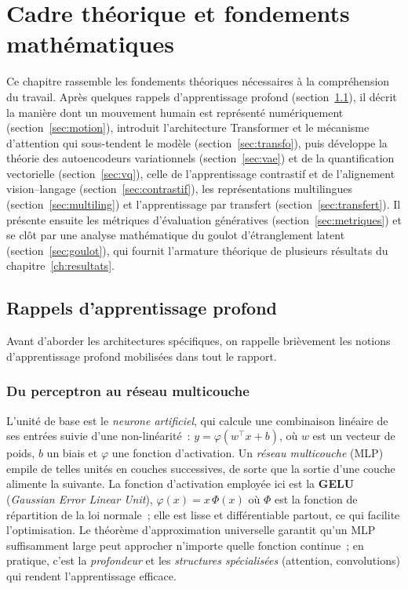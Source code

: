\documentclass[12pt,a4paper,oneside]{report}
\theoremstyle{definition}
\theoremstyle{plain}
\begin{document}
\chapter{Cadre théorique et fondements mathématiques}
\label{ch:theorie}

Ce chapitre rassemble les fondements théoriques nécessaires à la compréhension
du travail. Après quelques rappels d'apprentissage profond (section~\ref{sec:dl}),
il décrit la manière dont un mouvement humain est représenté numériquement
(section~\ref{sec:motion}), introduit l'architecture Transformer et le mécanisme
d'attention qui sous-tendent le modèle (section~\ref{sec:transfo}), puis développe
la théorie des autoencodeurs variationnels (section~\ref{sec:vae}) et de la
quantification vectorielle (section~\ref{sec:vq}), celle de l'apprentissage
contrastif et de l'alignement vision--langage (section~\ref{sec:contrastif}), les
représentations multilingues (section~\ref{sec:multiling}) et l'apprentissage par
transfert (section~\ref{sec:transfert}). Il présente ensuite les métriques
d'évaluation génératives (section~\ref{sec:metriques}) et se clôt par une analyse
mathématique du goulot d'étranglement latent (section~\ref{sec:goulot}), qui
fournit l'armature théorique de plusieurs résultats du chapitre~\ref{ch:resultats}.

\section{Rappels d'apprentissage profond}
\label{sec:dl}

Avant d'aborder les architectures spécifiques, on rappelle brièvement les notions
d'apprentissage profond mobilisées dans tout le rapport.

\subsection{Du perceptron au réseau multicouche}

L'unité de base est le \emph{neurone artificiel}, qui calcule une combinaison
linéaire de ses entrées suivie d'une non-linéarité~: $y = \varphi(w^\top x + b)$, où
$w$ est un vecteur de poids, $b$ un biais et $\varphi$ une fonction d'activation. Un
\emph{réseau multicouche} (MLP) empile de telles unités en couches successives, de
sorte que la sortie d'une couche alimente la suivante. La fonction d'activation
employée ici est la \textbf{GELU}~\cite{hendrycks2016gelu} (\emph{Gaussian Error Linear Unit}),
$\varphi(x) = x\,\Phi(x)$ où $\Phi$ est la fonction de répartition de la loi
normale~; elle est lisse et différentiable partout, ce qui facilite l'optimisation.
Le théorème d'approximation universelle garantit qu'un MLP suffisamment large peut
approcher n'importe quelle fonction continue~; en pratique, c'est la \emph{profondeur}
et les \emph{structures spécialisées} (attention, convolutions) qui rendent
l'apprentissage efficace.
\end{document}
